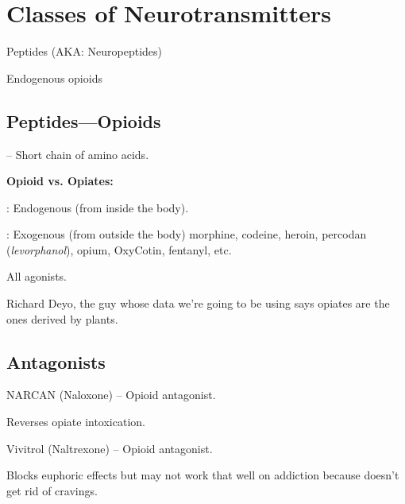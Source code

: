 \section{Classes of Neurotransmitters}

\begin{coloredlist}
    \item Peptides (AKA: Neuropeptides)
    \begin{coloredlist}
        \item Endogenous opioids
    \end{coloredlist}
\end{coloredlist}

\subsection{Peptides---Opioids}

\begin{coloredlist}
    \item {} -- Short chain of amino acids.
    \item \textbf{Opioid vs. Opiates:}
    \begin{coloredlist}
        \item {}: Endogenous (from inside the body).
        \item {}: Exogenous (from outside the body) morphine, codeine, heroin, percodan (\textit{levorphanol}), opium, OxyCotin, fentanyl, etc.
        \begin{coloredlist}
            \item All agonists.
        \end{coloredlist}
        \item Richard Deyo, the guy whose data we're going to be using says opiates are the ones derived by plants.
    \end{coloredlist}
\end{coloredlist}

\subsection{Antagonists}

\begin{coloredlist}
    \item NARCAN (Naloxone) -- Opioid antagonist.
    \begin{coloredlist}
        \item Reverses opiate intoxication.
    \end{coloredlist}
    \item Vivitrol (Naltrexone) -- Opioid antagonist.
    \begin{coloredlist}
        \item Blocks euphoric effects but may not work that well on addiction because doesn't get rid of cravings.
    \end{coloredlist}
\end{coloredlist}

